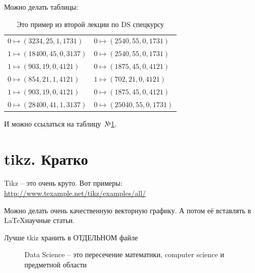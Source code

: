 \documentclass{beamer}
\newcommand{\рис}[1]{рис.\ref{#1}}
\newcommand{\Рис}[1]{Рис.\ref{#1}}
\newcommand{\таблицa}[1]{таблица~№\ref{#1}} %
\newcommand{\таблицы}[1]{таблицы~№\ref{#1}} %
\newcommand{\таблице}[1]{таблице~№\ref{#1}} %
\newcommand{\таблицу}[1]{таблицу~№\ref{#1}} %
\newcommand{\таблицей}[1]{таблицей~№\ref{#1}} %
\newcommand{\Таблицa}[1]{Таблица~№\ref{#1}} %
\newcommand{\Таблицы}[1]{Таблицы~№\ref{#1}} %
\newcommand{\Таблице}[1]{Таблице~№\ref{#1}} %
\newcommand{\Таблицу}[1]{Таблицу~№\ref{#1}} %
\newcommand{\Таблицей}[1]{Таблицей~№\ref{#1}} %
\begin{document}
\begin{frame}
	Можно делать таблицы:

	\begin{center}
	\small 
		\begin{table}
		\begin{tabular}{ l l }
			$0 \mapsto (3234, 25, 1, 1731) $ &  $0 \mapsto (2540, 55, 0, 1731)$ \\
			$1 \mapsto (18400, 45, 0, 3137)$ & $0 \mapsto (2540, 55, 0, 1731)$  \\
			$1 \mapsto (903, 19, 0, 4121)$  & $0 \mapsto (1875, 45, 0, 4121)$  \\
			$0 \mapsto (854, 21, 1, 4121)$  & $1 \mapsto (702, 21, 0, 4121)$  \\
			$1 \mapsto (903, 19, 0, 4121)$  & $0 \mapsto (1875, 45, 0, 4121)$  \\
			$0 \mapsto (28400, 41, 1, 3137)$ & $0 \mapsto (25040, 55, 0, 1731)$  \\
		\end{tabular}
		\caption{Это пример из второй лекции по DS спецкурсу}
		\label{table:example}
		\end{table}
	\end{center}
	И можно ссылаться на \таблицу{table:example}.
\end{frame}

 
\section{tikz. Кратко}\label{section:tkiz}

\begin{frame}
Tikz -- это очень круто. Вот примеры: \url{http://www.texample.net/tikz/examples/all/}

Можно делать очень качественную векторную графику. 
А потом её вставлять в \LaTeX научные статьи.

\end{frame}

\begin{frame}
	Лучше tkiz хранить в ОТДЕЛЬНОМ файле
	\begin{center}
		\begin{figure}
			
			\caption{Data Science -- это пересечение математики, computer science и предметной области }
		\end{figure}	
	\end{center}

\end{frame}
\end{document}
